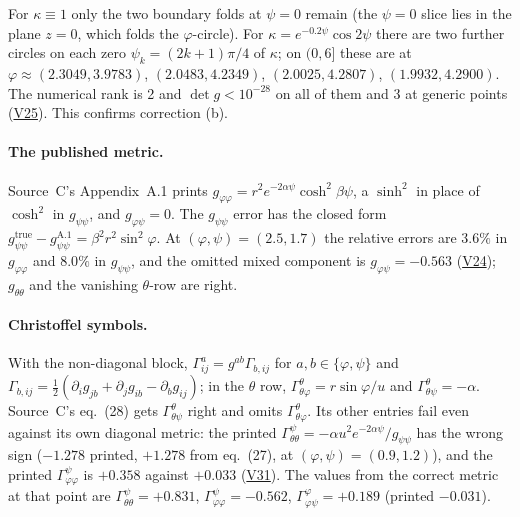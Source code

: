 \documentclass[11pt]{article}
\theoremstyle{definition}
\theoremstyle{remark}
\newcommand{\V}[1]{\hyperref[app:verify]{\textsf{#1}}}
\begin{document}
For $\kappa\equiv1$ only the two boundary folds at $\psi=0$ remain (the $\psi=0$ slice lies in the plane $z=0$, which folds the $\varphi$-circle). For $\kappa=e^{-0.2\psi}\cos2\psi$ there are two further circles on each zero $\psi_k=(2k+1)\pi/4$ of $\kappa$; on $(0,6]$ these are at $\varphi\approx(2.3049,3.9783)$, $(2.0483,4.2349)$, $(2.0025,4.2807)$, $(1.9932,4.2900)$. The numerical rank is 2 and $\det g<10^{-28}$ on all of them and 3 at generic points (\V{V25}). This confirms correction (b).

\paragraph{The published metric.} Source~C's Appendix~A.1 prints $g_{\varphi\varphi}=r^2e^{-2\alpha\psi}\cosh^2\!\beta\psi$, a $\sinh^2$ in place of $\cosh^2$ in $g_{\psi\psi}$, and $g_{\varphi\psi}=0$. The $g_{\psi\psi}$ error has the closed form $g_{\psi\psi}^{\mathrm{true}}-g_{\psi\psi}^{\mathrm{A.1}}=\beta^2r^2\sin^2\!\varphi$. At $(\varphi,\psi)=(2.5,1.7)$ the relative errors are $3.6\%$ in $g_{\varphi\varphi}$ and $8.0\%$ in $g_{\psi\psi}$, and the omitted mixed component is $g_{\varphi\psi}=-0.563$ (\V{V24}); $g_{\theta\theta}$ and the vanishing $\theta$-row are right.

\paragraph{Christoffel symbols.} With the non-diagonal block, $\Gamma^a_{ij}=g^{ab}\Gamma_{b,ij}$ for $a,b\in\{\varphi,\psi\}$ and $\Gamma_{b,ij}=\tfrac12(\partial_ig_{jb}+\partial_jg_{ib}-\partial_bg_{ij})$; in the $\theta$ row, $\Gamma^\theta_{\theta\varphi}=r\sin\varphi/u$ and $\Gamma^\theta_{\theta\psi}=-\alpha$. Source~C's eq.~(28) gets $\Gamma^\theta_{\theta\psi}$ right and omits $\Gamma^\theta_{\theta\varphi}$. Its other entries fail even against its own diagonal metric: the printed $\Gamma^\psi_{\theta\theta}=-\alpha u^2e^{-2\alpha\psi}/g_{\psi\psi}$ has the wrong sign ($-1.278$ printed, $+1.278$ from eq.~(27), at $(\varphi,\psi)=(0.9,1.2)$), and the printed $\Gamma^\psi_{\varphi\varphi}$ is $+0.358$ against $+0.033$ (\V{V31}). The values from the correct metric at that point are $\Gamma^\psi_{\theta\theta}=+0.831$, $\Gamma^\psi_{\varphi\varphi}=-0.562$, $\Gamma^\varphi_{\varphi\psi}=+0.189$ (printed $-0.031$).
\end{document}
